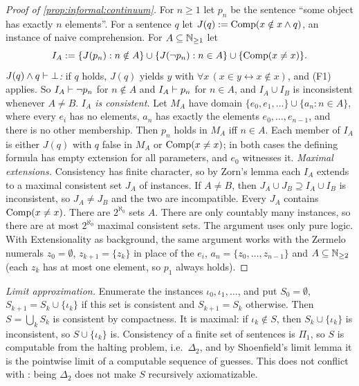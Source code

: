 \begin{proof}[Proof of \cref{prop:informal:continuum}]
For $n\ge1$ let $p_n$ be the sentence ``some object has exactly $n$ elements''. For a sentence $q$ let $J(q):=\mathrm{Comp}(x\notin x\wedge q)$, an instance of naive comprehension. For $A\subseteq\mathbb{N}_{\ge1}$ let
\[
I_A:=\{J(p_n):n\notin A\}\cup\{J(\neg p_n):n\in A\}\cup\{\mathrm{Comp}(x\ne x)\}.
\]
\emph{$J(q)\wedge q\vdash\bot$:} if $q$ holds, $J(q)$ yields $y$ with $\forall x\,(x\in y\leftrightarrow x\notin x)$, and (F1) applies. So $I_A\vdash\neg p_n$ for $n\notin A$ and $I_A\vdash p_n$ for $n\in A$, and $I_A\cup I_B$ is inconsistent whenever $A\ne B$.
\emph{$I_A$ is consistent.} Let $M_A$ have domain $\{e_0,e_1,\dots\}\cup\{a_n:n\in A\}$, where every $e_i$ has no elements, $a_n$ has exactly the elements $e_0,\dots,e_{n-1}$, and there is no other membership. Then $p_n$ holds in $M_A$ iff $n\in A$. Each member of $I_A$ is either $J(q)$ with $q$ false in $M_A$ or $\mathrm{Comp}(x\ne x)$; in both cases the defining formula has empty extension for all parameters, and $e_0$ witnesses it.
\emph{Maximal extensions.} Consistency has finite character, so by Zorn's lemma each $I_A$ extends to a maximal consistent set $J_A$ of instances. If $A\ne B$, then $J_A\cup J_B\supseteq I_A\cup I_B$ is inconsistent, so $J_A\ne J_B$ and the two are incompatible. Every $J_A$ contains $\mathrm{Comp}(x\ne x)$. There are $2^{\aleph_0}$ sets $A$. There are only countably many instances, so there are at most $2^{\aleph_0}$ maximal consistent sets.
The argument uses only pure logic. With Extensionality as background, the same argument works with the Zermelo numerals $z_0=\emptyset$, $z_{k+1}=\{z_k\}$ in place of the $e_i$, $a_n=\{z_0,\dots,z_{n-1}\}$ and $A\subseteq\mathbb{N}_{\ge2}$ (each $z_k$ has at most one element, so $p_1$ always holds).
\end{proof}

\emph{Limit approximation.} Enumerate the instances $\iota_0,\iota_1,\dots$, and put $S_0=\emptyset$, $S_{k+1}=S_k\cup\{\iota_k\}$ if this set is consistent and $S_{k+1}=S_k$ otherwise. Then $S=\bigcup_kS_k$ is consistent by compactness. It is maximal: if $\iota_k\notin S$, then $S_k\cup\{\iota_k\}$ is inconsistent, so $S\cup\{\iota_k\}$ is. Consistency of a finite set of sentences is $\Pi_1$, so $S$ is computable from the halting problem, i.e.\ $\Delta_2$, and by Shoenfield's limit lemma it is the pointwise limit of a computable sequence of guesses. This does not conflict with \citet{incurvati2017maximally}: being $\Delta_2$ does not make $S$ recursively axiomatizable.

